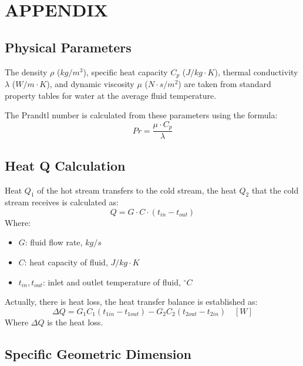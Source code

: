 \section{APPENDIX}\label{appendix}

\subsection{Physical Parameters}\label{physical-parameters}

The density $\rho$ ($kg/m^3$), specific heat capacity $C_p$ ($J/kg \cdot K$), thermal conductivity $\lambda$ ($W/m \cdot K$), and dynamic viscosity $\mu$ ($N \cdot s / m^2$) are taken from standard property tables for water at the average fluid temperature.

The Prandtl number is calculated from these parameters using the formula:
\begin{equation}
    Pr = \frac{\mu \cdot C_p}{\lambda}
\end{equation}

\subsection{Heat Q Calculation}\label{heat-q-calculation}

Heat $Q_1$ of the hot stream transfers to the cold stream, the heat $Q_2$ that the cold stream receives is calculated as:
\begin{equation}
    Q = G \cdot C \cdot (t_{in} - t_{out})
\end{equation}
Where:
\begin{itemize}
    \item $G$: fluid flow rate, $kg/s$
    \item $C$: heat capacity of fluid, $J/kg \cdot K$
    \item $t_{in}, t_{out}$: inlet and outlet temperature of fluid, $^\circ C$
\end{itemize}

Actually, there is heat loss, the heat transfer balance is established as:
\begin{equation}
    \Delta Q = G_1 C_1 (t_{1in} - t_{1out}) - G_2 C_2 (t_{2out} - t_{2in}) \quad [W]
\end{equation}
Where $\Delta Q$ is the heat loss.

\subsection{Specific Geometric Dimension}\label{specific-geometric-dimension}

